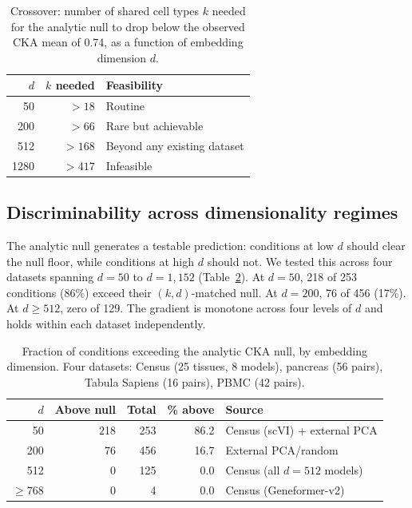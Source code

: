 \documentclass[11pt]{article}
\begin{document}
\begin{table}[t]
\centering
\caption{Crossover: number of shared cell types $k$ needed for the
analytic null to drop below the observed CKA mean of 0.74, as a function
of embedding dimension $d$.}
\label{tab:crossover}
\small
\begin{tabular}{@{}rrl@{}}
\toprule
$d$ & $k$ needed & Feasibility \\
\midrule
50   & $> 18$  & Routine \\
200  & $> 66$  & Rare but achievable \\
512  & $> 168$ & Beyond any existing dataset \\
1280 & $> 417$ & Infeasible \\
\bottomrule
\end{tabular}
\end{table}


\subsection{Discriminability across dimensionality regimes}
\label{sec:deffect}

The analytic null generates a testable prediction: conditions at low $d$
should clear the null floor, while conditions at high $d$ should not. We
tested this across four datasets spanning $d = 50$ to $d = 1{,}152$
(Table~\ref{tab:deffect}). At $d = 50$, 218 of 253 conditions (86\%)
exceed their $(k, d)$-matched null. At $d = 200$, 76 of 456 (17\%).
At $d \geq 512$, zero of 129. The gradient is monotone across four
levels of $d$ and holds within each dataset independently.

\begin{table}[t]
\centering
\caption{Fraction of conditions exceeding the analytic CKA null, by
embedding dimension. Four datasets: Census (25 tissues, 8 models),
pancreas (56 pairs), Tabula Sapiens (16 pairs), PBMC (42 pairs).}
\label{tab:deffect}
\small
\begin{tabular}{@{}rrrrl@{}}
\toprule
$d$ & Above null & Total & \% above & Source \\
\midrule
50   & 218 & 253 & 86.2 & Census (scVI) + external PCA \\
200  &  76 & 456 & 16.7 & External PCA/random \\
512  &   0 & 125 &  0.0 & Census (all $d{=}512$ models) \\
$\geq 768$ & 0 & 4 & 0.0 & Census (Geneformer-v2) \\
\bottomrule
\end{tabular}
\end{table}
\end{document}
